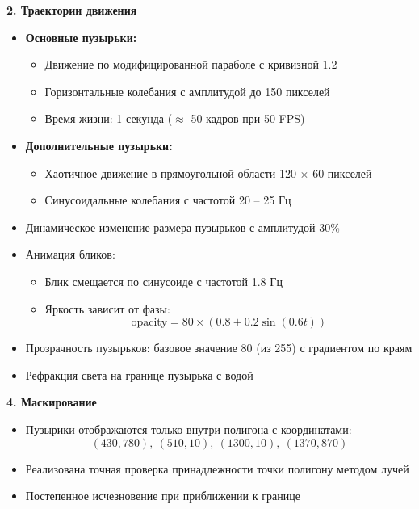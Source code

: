 \documentclass[areasetadvanced]{scrartcl}
\begin{document}
\textbf{2. Траектории движения}

\begin{itemize}
    \item \textbf{Основные пузырьки:}
    \begin{itemize}
        \item Движение по модифицированной параболе с кривизной 1.2
        \item Горизонтальные колебания с амплитудой до 150 пикселей
        \item Время жизни: 1 секунда ($\approx$ 50 кадров при 50 FPS)
    \end{itemize}
    \item \textbf{Дополнительные пузырьки:}
    \begin{itemize}
        \item Хаотичное движение в прямоугольной области 120 $\times$ 60 пикселей
        \item Синусоидальные колебания с частотой 20 -- 25 Гц
    \end{itemize}
    \item Динамическое изменение размера пузырьков с амплитудой 30\%
    \item Анимация бликов:
    \begin{itemize}
        \item Блик смещается по синусоиде с частотой 1.8 Гц
        \item Яркость зависит от фазы:
        \[
            \text{opacity} = 80 \times (0.8 + 0.2 \sin(0.6 t))
        \]
    \end{itemize}
    \item Прозрачность пузырьков: базовое значение 80 (из 255) с градиентом по краям
    \item Рефракция света на границе пузырька с водой
    \end{itemize}

\textbf{4. Маскирование}
\begin{itemize}
    \item Пузырики отображаются только внутри полигона с координатами:
    \[
        (430, 780),\ (510, 10),\ (1300, 10),\ (1370, 870)
    \]
    \item Реализована точная проверка принадлежности точки полигону методом лучей
    \item Постепенное исчезновение при приближении к границе
\end{itemize}

\newpage
\end{document}
